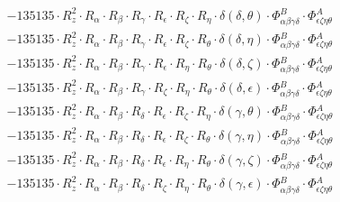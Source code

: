 \documentclass{article}
\begin{document}
\begin{equation}
\begin{array}{c}
 \\[0.2em] 		 - 135135 \cdot R_{z}^{2} \cdot R_{\alpha{}} \cdot R_{\beta{}} \cdot R_{\gamma{}} \cdot R_{\epsilon{}} \cdot R_{\zeta{}} \cdot R_{\eta{}} \cdot \delta{}\left(\delta{}, \theta{}\right) \cdot \Phi{}^{B}_{\alpha{}\beta{}\gamma{}\delta{}} \cdot \Phi{}^{A}_{\epsilon{}\zeta{}\eta{}\theta{}} 
 \\[0.2em] 		 - 135135 \cdot R_{z}^{2} \cdot R_{\alpha{}} \cdot R_{\beta{}} \cdot R_{\gamma{}} \cdot R_{\epsilon{}} \cdot R_{\zeta{}} \cdot R_{\theta{}} \cdot \delta{}\left(\delta{}, \eta{}\right) \cdot \Phi{}^{B}_{\alpha{}\beta{}\gamma{}\delta{}} \cdot \Phi{}^{A}_{\epsilon{}\zeta{}\eta{}\theta{}} 
 \\[0.2em] 		 - 135135 \cdot R_{z}^{2} \cdot R_{\alpha{}} \cdot R_{\beta{}} \cdot R_{\gamma{}} \cdot R_{\epsilon{}} \cdot R_{\eta{}} \cdot R_{\theta{}} \cdot \delta{}\left(\delta{}, \zeta{}\right) \cdot \Phi{}^{B}_{\alpha{}\beta{}\gamma{}\delta{}} \cdot \Phi{}^{A}_{\epsilon{}\zeta{}\eta{}\theta{}} 
 \\[0.2em] 		 - 135135 \cdot R_{z}^{2} \cdot R_{\alpha{}} \cdot R_{\beta{}} \cdot R_{\gamma{}} \cdot R_{\zeta{}} \cdot R_{\eta{}} \cdot R_{\theta{}} \cdot \delta{}\left(\delta{}, \epsilon{}\right) \cdot \Phi{}^{B}_{\alpha{}\beta{}\gamma{}\delta{}} \cdot \Phi{}^{A}_{\epsilon{}\zeta{}\eta{}\theta{}} 
 \\[0.2em] 		 - 135135 \cdot R_{z}^{2} \cdot R_{\alpha{}} \cdot R_{\beta{}} \cdot R_{\delta{}} \cdot R_{\epsilon{}} \cdot R_{\zeta{}} \cdot R_{\eta{}} \cdot \delta{}\left(\gamma{}, \theta{}\right) \cdot \Phi{}^{B}_{\alpha{}\beta{}\gamma{}\delta{}} \cdot \Phi{}^{A}_{\epsilon{}\zeta{}\eta{}\theta{}} 
 \\[0.2em] 		 - 135135 \cdot R_{z}^{2} \cdot R_{\alpha{}} \cdot R_{\beta{}} \cdot R_{\delta{}} \cdot R_{\epsilon{}} \cdot R_{\zeta{}} \cdot R_{\theta{}} \cdot \delta{}\left(\gamma{}, \eta{}\right) \cdot \Phi{}^{B}_{\alpha{}\beta{}\gamma{}\delta{}} \cdot \Phi{}^{A}_{\epsilon{}\zeta{}\eta{}\theta{}} 
 \\[0.2em] 		 - 135135 \cdot R_{z}^{2} \cdot R_{\alpha{}} \cdot R_{\beta{}} \cdot R_{\delta{}} \cdot R_{\epsilon{}} \cdot R_{\eta{}} \cdot R_{\theta{}} \cdot \delta{}\left(\gamma{}, \zeta{}\right) \cdot \Phi{}^{B}_{\alpha{}\beta{}\gamma{}\delta{}} \cdot \Phi{}^{A}_{\epsilon{}\zeta{}\eta{}\theta{}} 
 \\[0.2em] 		 - 135135 \cdot R_{z}^{2} \cdot R_{\alpha{}} \cdot R_{\beta{}} \cdot R_{\delta{}} \cdot R_{\zeta{}} \cdot R_{\eta{}} \cdot R_{\theta{}} \cdot \delta{}\left(\gamma{}, \epsilon{}\right) \cdot \Phi{}^{B}_{\alpha{}\beta{}\gamma{}\delta{}} \cdot \Phi{}^{A}_{\epsilon{}\zeta{}\eta{}\theta{}} 

\end{array}
\end{equation}
\end{document}
